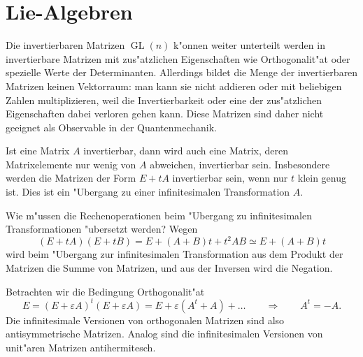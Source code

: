 %
%
\section{Lie-Algebren}
Die invertierbaren Matrizen $\operatorname{GL}(n)$ k"onnen weiter
unterteilt werden in invertierbare Matrizen mit zus"atzlichen
Eigenschaften wie Orthogonalit"at oder spezielle Werte der Determinanten.
Allerdings bildet die Menge der invertierbaren Matrizen keinen
Vektorraum: man kann sie nicht addieren oder mit beliebigen Zahlen
multiplizieren, weil die Invertierbarkeit oder eine der zus"atzlichen
Eigenschaften dabei verloren gehen kann. Diese Matrizen sind 
daher nicht geeignet als Observable in der Quantenmechanik.

Ist eine Matrix $A$ invertierbar, dann wird auch eine Matrix, deren
Matrixelemente nur wenig von $A$ abweichen, invertierbar sein.
Insbesondere werden die Matrizen der Form $E+tA$ invertierbar sein,
wenn nur $t$ klein genug ist. Dies ist ein "Ubergang zu einer 
infinitesimalen Transformation $A$.

Wie m"ussen die Rechenoperationen beim "Ubergang zu infinitesimalen
Transformationen "ubersetzt werden?
Wegen
\[
(E+tA)(E+tB)=E+(A+B)t + t^2AB\simeq E+(A+B)t
\]
wird beim "Ubergang zur infinitesimalen Transformation aus dem Produkt
der Matrizen die Summe von Matrizen, und aus der Inversen wird die Negation.

Betrachten wir die Bedingung Orthogonalit"at
\[
E=
(E+\varepsilon A)^t(E+\varepsilon A)
=
E+\varepsilon (A^t+A) + \dots
\qquad
\Rightarrow
\qquad
A^t=-A.
\]
Die infinitesimale Versionen von orthogonalen Matrizen sind also
antisymmetrische Matrizen.
Analog sind die infinitesimalen Versionen von unit"aren Matrizen
antihermitesch.

